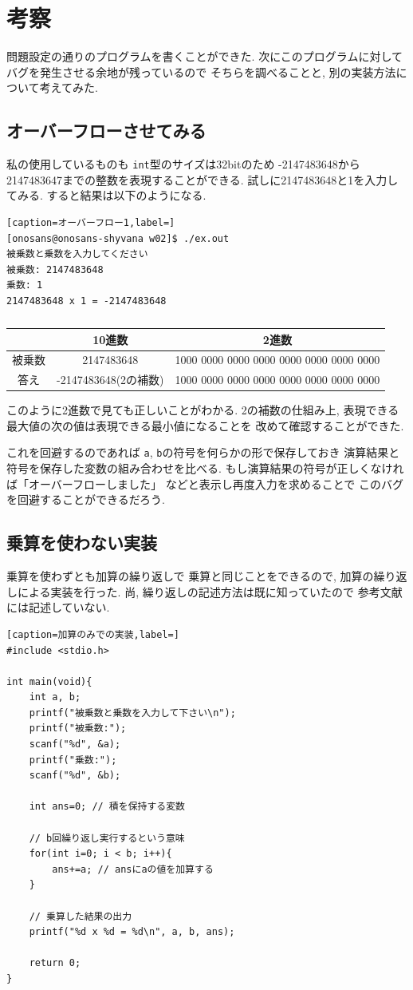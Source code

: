 \documentclass[a4paper, xelatex, ja=standard]{bxjsarticle}
\begin{document}
\section{考察}
問題設定の通りのプログラムを書くことができた.
次にこのプログラムに対してバグを発生させる余地が残っているので
そちらを調べることと,
別の実装方法について考えてみた.

\subsection{オーバーフローさせてみる}
私の使用しているものも
\texttt{int}型のサイズは32bitのため
-2147483648から2147483647までの整数を表現することができる.
試しに2147483648と1を入力してみる.
すると結果は以下のようになる.
\begin{lstlisting}[caption=オーバーフロー1,label=]
[onosans@onosans-shyvana w02]$ ./ex.out
被乗数と乗数を入力してください
被乗数: 2147483648
乗数: 1
2147483648 x 1 = -2147483648
\end{lstlisting}

\begin{table}[h]
  \centering
  \caption{}
  \label{}
  \begin{tabular}{|c||c|c|}
  \hline
  & 10進数 & 2進数 \\ \hline
  被乗数 & 2147483648 & 1000 0000 0000 0000 0000 0000 0000 0000 \\ \hline
  答え & -2147483648(2の補数) & 1000 0000 0000 0000 0000 0000 0000 0000 \\ \hline
  \end{tabular}
\end{table}
このように2進数で見ても正しいことがわかる.
2の補数の仕組み上,
表現できる最大値の次の値は表現できる最小値になることを
改めて確認することができた.

これを回避するのであれば
\texttt{a}, \texttt{b}の符号を何らかの形で保存しておき
演算結果と符号を保存した変数の組み合わせを比べる.
もし演算結果の符号が正しくなければ「オーバーフローしました」
などと表示し再度入力を求めることで
このバグを回避することができるだろう.

\subsection{乗算を使わない実装}
乗算を使わずとも加算の繰り返しで
乗算と同じことをできるので,
加算の繰り返しによる実装を行った.
尚, 繰り返しの記述方法は既に知っていたので
参考文献には記述していない.
\begin{lstlisting}[caption=加算のみでの実装,label=]
#include <stdio.h>

int main(void){
	int a, b;
	printf("被乗数と乗数を入力して下さい\n");
	printf("被乗数:");
	scanf("%d", &a);
	printf("乗数:");
	scanf("%d", &b);

	int ans=0; // 積を保持する変数

	// b回繰り返し実行するという意味
	for(int i=0; i < b; i++){
		ans+=a; // ansにaの値を加算する
	}

	// 乗算した結果の出力
	printf("%d x %d = %d\n", a, b, ans);

	return 0;
}
\end{lstlisting}
\end{document}
